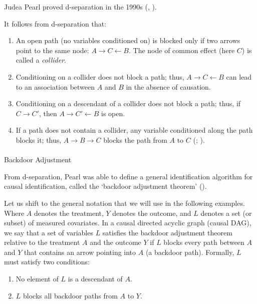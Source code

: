\documentclass[
  single column]{article}
\makeatletter
\let\oldparagraph\paragraph
\renewcommand{\paragraph}{
    \@ifstar
      \xxxParagraphStar
      \xxxParagraphNoStar
  }
\newcommand{\xxxParagraphStar}[1]{\oldparagraph*{#1}\mbox{}}
\newcommand{\xxxParagraphNoStar}[1]{\oldparagraph{#1}\mbox{}}
\providecommand{\tightlist}{%
  \setlength{\itemsep}{0pt}\setlength{\parskip}{0pt}}\usepackage{longtable,booktabs,array}
\makeatother
\begin{document}
Judea Pearl proved d-separation in the 1990s
(,
).

It follows from d-separation that:

\begin{enumerate}
\def\labelenumi{\arabic{enumi}.}
\tightlist
\item
  An open path (no variables conditioned on) is blocked only if two
  arrows point to the same node: \(A \rightarrow C \leftarrow B\). The
  node of common effect (here \(C\)) is called a \emph{collider}.
\item
  Conditioning on a collider does not block a path; thus,
  \(A \rightarrow \boxed{C} \leftarrow B\) can lead to an association
  between \(A\) and \(B\) in the absence of causation.
\item
  Conditioning on a descendant of a collider does not block a path;
  thus, if \(C \rightarrow \boxed{C'}\), then
  \(A \rightarrow \boxed{C'} \leftarrow B\) is open.
\item
  If a path does not contain a collider, any variable conditioned along
  the path blocks it; thus, \(A \rightarrow \boxed{B} \rightarrow C\)
  blocks the path from \(A\) to \(C\)
  (;
  ).
\end{enumerate}

\paragraph{Backdoor Adjustment}\label{backdoor-adjustment}

From d-separation, Pearl was able to define a general identification
algorithm for causal identification, called the `backdoor adjustment
theorem' ().

Let us shift to the general notation that we will use in the following
examples. Where \(A\) denotes the treatment, \(Y\) denotes the outcome,
and \(L\) denotes a set (or subset) of measured covariates. In a causal
directed acyclic graph (causal DAG), we say that a set of variables
\(L\) satisfies the backdoor adjustment theorem relative to the
treatment \(A\) and the outcome \(Y\) if \(L\) blocks every path between
\(A\) and \(Y\) that contains an arrow pointing into \(A\) (a backdoor
path). Formally, \(L\) must satisfy two conditions:

\begin{enumerate}
\def\labelenumi{\arabic{enumi}.}
\tightlist
\item
  No element of \(L\) is a descendant of \(A\).
\item
  \(L\) blocks all backdoor paths from \(A\) to \(Y\).
\end{enumerate}
\end{document}
